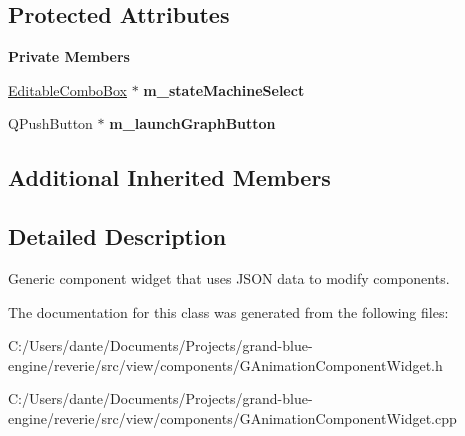 \subsection*{Protected Attributes}
\begin{Indent}\textbf{ Private Members}\par
\begin{DoxyCompactItemize}
\item 
\mbox{\label{classrev_1_1_view_1_1_animation_component_widget_af806e1793ee00856616c0cfa2a09180f}} 
\mbox{\hyperlink{classrev_1_1_view_1_1_editable_combo_box}{Editable\+Combo\+Box}} $\ast$ {\bfseries m\+\_\+state\+Machine\+Select}
\item 
\mbox{\label{classrev_1_1_view_1_1_animation_component_widget_ac6e221d10ce5048a719e88e875247715}} 
Q\+Push\+Button $\ast$ {\bfseries m\+\_\+launch\+Graph\+Button}
\end{DoxyCompactItemize}
\end{Indent}
\subsection*{Additional Inherited Members}


\subsection{Detailed Description}
Generic component widget that uses J\+S\+ON data to modify components. 

The documentation for this class was generated from the following files\+:\begin{DoxyCompactItemize}
\item 
C\+:/\+Users/dante/\+Documents/\+Projects/grand-\/blue-\/engine/reverie/src/view/components/G\+Animation\+Component\+Widget.\+h\item 
C\+:/\+Users/dante/\+Documents/\+Projects/grand-\/blue-\/engine/reverie/src/view/components/G\+Animation\+Component\+Widget.\+cpp\end{DoxyCompactItemize}
